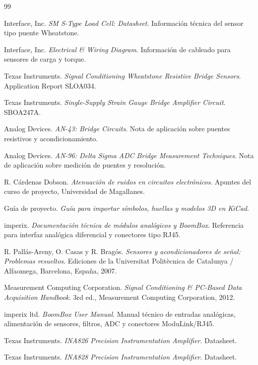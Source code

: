 \documentclass[12pt]{article}
\begin{document}
\begin{thebibliography}{99}

Interface, Inc. \emph{SM S-Type Load Cell: Datasheet}. Información técnica del sensor tipo puente Wheatstone.

Interface, Inc. \emph{Electrical \& Wiring Diagram}. Información de cableado para sensores de carga y torque.

Texas Instruments. \emph{Signal Conditioning Wheatstone Resistive Bridge Sensors}. Application Report SLOA034.

Texas Instruments. \emph{Single-Supply Strain Gauge Bridge Amplifier Circuit}. SBOA247A.

Analog Devices. \emph{AN-43: Bridge Circuits}. Nota de aplicación sobre puentes resistivos y acondicionamiento.

Analog Devices. \emph{AN-96: Delta Sigma ADC Bridge Measurement Techniques}. Nota de aplicación sobre medición de puentes y resolución.

R. Cárdenas Dobson. \emph{Atenuación de ruidos en circuitos electrónicos}. Apuntes del curso de proyecto, Universidad de Magallanes.

Guía de proyecto. \emph{Guía para importar símbolos, huellas y modelos 3D en KiCad}.

imperix. \emph{Documentación técnica de módulos analógicos y BoomBox}. Referencia para interfaz analógica diferencial y conectores tipo RJ45.


R. Pallás-Areny, O. Casas y R. Bragós. \emph{Sensores y acondicionadores de señal: Problemas resueltos}. Ediciones de la Universitat Politècnica de Catalunya / Alfaomega, Barcelona, España, 2007.

Measurement Computing Corporation. \emph{Signal Conditioning \& PC-Based Data Acquisition Handbook}. 3rd ed., Measurement Computing Corporation, 2012.

imperix ltd. \emph{BoomBox User Manual}. Manual técnico de entradas analógicas, alimentación de sensores, filtros, ADC y conectores ModuLink/RJ45.

Texas Instruments. \emph{INA826 Precision Instrumentation Amplifier}. Datasheet.

Texas Instruments. \emph{INA828 Precision Instrumentation Amplifier}. Datasheet.


\end{thebibliography}
\end{document}
